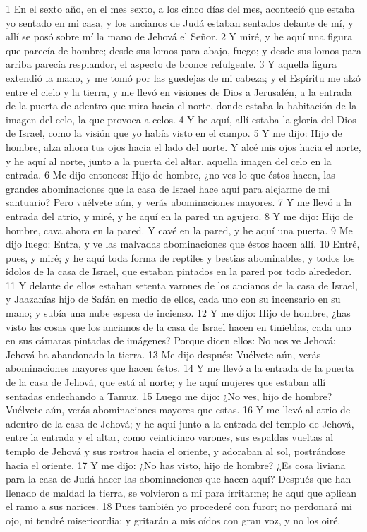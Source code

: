 1 En el sexto año, en el mes sexto, a los cinco días del mes, aconteció que estaba yo sentado en mi casa, y los ancianos de Judá estaban sentados delante de mí, y allí se posó sobre mí la mano de Jehová el Señor.
2 Y miré, y he aquí una figura que parecía de hombre; desde sus lomos para abajo, fuego; y desde sus lomos para arriba parecía resplandor, el aspecto de bronce refulgente. 
3 Y aquella figura extendió la mano, y me tomó por las guedejas de mi cabeza; y el Espíritu me alzó entre el cielo y la tierra, y me llevó en visiones de Dios a Jerusalén, a la entrada de la puerta de adentro que mira hacia el norte, donde estaba la habitación de la imagen del celo, la que provoca a celos.
4 Y he aquí, allí estaba la gloria del Dios de Israel, como la visión que yo había visto en el campo. 
5 Y me dijo: Hijo de hombre, alza ahora tus ojos hacia el lado del norte. Y alcé mis ojos hacia el norte, y he aquí al norte, junto a la puerta del altar, aquella imagen del celo en la entrada.
6 Me dijo entonces: Hijo de hombre, ¿no ves lo que éstos hacen, las grandes abominaciones que la casa de Israel hace aquí para alejarme de mi santuario? Pero vuélvete aún, y verás abominaciones mayores.
7 Y me llevó a la entrada del atrio, y miré, y he aquí en la pared un agujero.
8 Y me dijo: Hijo de hombre, cava ahora en la pared. Y cavé en la pared, y he aquí una puerta.
9 Me dijo luego: Entra, y ve las malvadas abominaciones que éstos hacen allí.
10 Entré, pues, y miré; y he aquí toda forma de reptiles y bestias abominables, y todos los ídolos de la casa de Israel, que estaban pintados en la pared por todo alrededor.
11 Y delante de ellos estaban setenta varones de los ancianos de la casa de Israel, y Jaazanías hijo de Safán en medio de ellos, cada uno con su incensario en su mano; y subía una nube espesa de incienso.
12 Y me dijo: Hijo de hombre, ¿has visto las cosas que los ancianos de la casa de Israel hacen en tinieblas, cada uno en sus cámaras pintadas de imágenes? Porque dicen ellos: No nos ve Jehová; Jehová ha abandonado la tierra.
13 Me dijo después: Vuélvete aún, verás abominaciones mayores que hacen éstos.
14 Y me llevó a la entrada de la puerta de la casa de Jehová, que está al norte; y he aquí mujeres que estaban allí sentadas endechando a Tamuz.
15 Luego me dijo: ¿No ves, hijo de hombre? Vuélvete aún, verás abominaciones mayores que estas.
16 Y me llevó al atrio de adentro de la casa de Jehová; y he aquí junto a la entrada del templo de Jehová, entre la entrada y el altar, como veinticinco varones, sus espaldas vueltas al templo de Jehová y sus rostros hacia el oriente, y adoraban al sol, postrándose hacia el oriente.
17 Y me dijo: ¿No has visto, hijo de hombre? ¿Es cosa liviana para la casa de Judá hacer las abominaciones que hacen aquí? Después que han llenado de maldad la tierra, se volvieron a mí para irritarme; he aquí que aplican el ramo a sus narices.
18 Pues también yo procederé con furor; no perdonará mi ojo, ni tendré misericordia; y gritarán a mis oídos con gran voz, y no los oiré.

